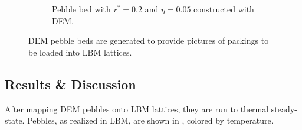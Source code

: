 \begin{figure}[!ht]
\begin{subfigure}[b]{0.44\textwidth}
        \caption{Pebble bed with $r^* = 0.2$ and $\eta = 0.05$ constructed with DEM.}\label{fig:lbm-crushed}
    \end{subfigure}
    \caption{DEM pebble beds are generated to provide pictures of packings to be loaded into LBM lattices.}\label{fig:dem-for-lbm}
\end{figure}



\subsection{Results \& Discussion}

After mapping DEM pebbles onto LBM lattices, they are run to thermal steady-state. Pebbles, as realized in LBM, are shown in , colored by temperature.

